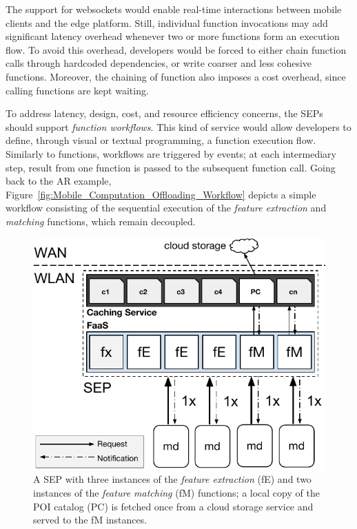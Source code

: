 The support for websockets would enable real-time interactions between mobile clients and the edge platform. Still, individual function invocations may add significant latency overhead whenever two or more functions form an execution flow. To avoid this overhead, developers would be forced to either chain function calls through hardcoded dependencies, or write coarser and less cohesive functions. Moreover, the chaining of function also imposes a cost overhead, since calling functions are kept waiting.%

To address latency, design, cost, and resource efficiency concerns, the SEPs should support \textit{function workflows}. This kind of service would allow developers to define, through visual or textual programming, a function execution flow.
Similarly to functions, workflows are triggered by events; at each intermediary step, result from one function is passed to the subsequent function call. Going back to the AR example, Figure~\ref{fig:Mobile_Computation_Offloading_Workflow} depicts a simple workflow consisting of the sequential execution of the \textit{feature extraction} and \textit{matching} functions, which remain decoupled.%

\begin{figure}[tbp]
	\centering
	\includegraphics[width=\linewidth]{Figs/Mobile_Computation_Offloading_Caching.pdf}
	\caption{A SEP with three instances of the \textit{feature extraction} (fE) and two instances of the \textit{feature matching} (fM) functions; a local copy of the POI catalog (PC) is fetched once from a cloud storage service and served to the fM instances.} 
	\label{fig:Mobile_Computation_Offloading_Caching}
\end{figure}

